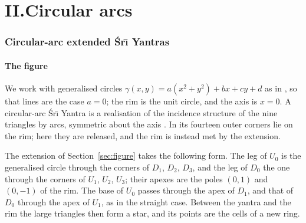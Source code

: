 \documentclass[11pt,a4paper]{article}
\theoremstyle{definition}
\theoremstyle{remark}
\newcommand{\Sri}{\'Sr\={\i}}
\begin{document}
\part*{II.\quad Circular arcs}

\section{Circular-arc extended \texorpdfstring{\Sri{}}{Sri} Yantras}\label{sec:arcs}

\subsection{The figure}
We work with generalised circles $\gamma(x,y) = a(x^2+y^2) + bx + cy + d$ as in \cite[\S3]{CK}, so that
lines are the case $a = 0$; the rim is the unit circle, and the axis is $x = 0$. A circular-arc
\Sri{} Yantra is a realisation of the incidence structure of the nine triangles by arcs, symmetric about
the axis \cite[Definition~3.1]{CK}. In \cite{CK} its fourteen outer corners lie on the rim; here they are
released, and the rim is instead met by the extension.

The extension of Section~\ref{sec:figure} takes the following form. The leg of $U_0$ is the generalised
circle through the corners of $D_1$, $D_2$, $D_3$, and the leg of $D_0$ the one through the corners of
$U_1$, $U_2$, $U_3$; their apexes are the poles $(0, 1)$ and $(0, -1)$ of the rim. The base of $U_0$ passes
through the apex of $D_1$, and that of $D_0$ through the apex of $U_1$, as in the straight case. Between
the yantra and the rim the large triangles then form a star, and its points are the cells of a new ring.
\end{document}
